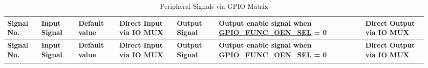 \begin{longtable}{|L{1.1cm}|L{4.0cm}|C{1.2cm}|C{1.8cm}|L{4.3cm}|L{5.0cm}|C{1.8cm}| }
     \caption{Peripheral Signals via GPIO Matrix}
     \label{tab:iomuxgpio-periph-signals-via-gpio-matrix} \\
     \hline
\textbf{Signal No.} & \textbf{Input Signal} & \textbf{Default value} &  \textbf{Direct Input via IO MUX} & \textbf{Output Signal} & \textbf{Output enable signal when \hyperref[fielddesc:GPIOFUNCNOENSEL]{GPIO\_FUNC\_OEN\_SEL} = 0} & \textbf{Direct Output via IO MUX}\\
\hline
\endfirsthead
     \hline
\textbf{Signal No.} & \textbf{Input Signal} & \textbf{Default value} &  \textbf{Direct Input via IO MUX} & \textbf{Output Signal} & \textbf{Output enable signal when \hyperref[fielddesc:GPIOFUNCNOENSEL]{GPIO\_FUNC\_OEN\_SEL} = 0} & \textbf{Direct Output via IO MUX}\\
     \hline
     \endhead
     \endfoot
 

\end{longtable}
